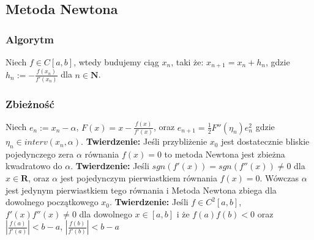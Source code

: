 \documentclass{article}
\begin{document}
\begin{minipage}[t]{.325\textwidth}
\subsection*{Metoda Newtona}
\subsubsection*{Algorytm}
Niech $f \in C[a,b]$, wtedy budujemy ciąg ${x_n}$, taki że: $x_{n+1} = x_{n} + h_n$, gdzie $h_n := -\frac{f(x_n)}{f'(x_n)}$ dla $n \in \mathbf{N}$.
\subsubsection*{Zbieżność}
Niech $e_n := x_n - \alpha$, $F(x) = x - \frac{f(x)}{f'(x)}$, oraz $e_{n+1} = \frac{1}{2}F''(\eta_n)e_n^2$ gdzie $\eta_n \in interv(x_n,\alpha)$.
\textbf{Twierdzenie:\;} Jeśli przybliżenie $x_0$ jest dostatecznie bliskie pojedynczego zera $\alpha$ równania $f(x) = 0$ to metoda Newtona jest zbieżna kwadratowo do $\alpha$.  \textbf{Twierdzenie:\;} Jeśli $sgn(f'(x)) = sgn(f''(x)) \neq 0$ dla $x \in \mathbf{R}$, oraz $\alpha$ jest pojedynczym pierwiastkiem równania $f(x) = 0$. 
Wówczas $\alpha$ jest jedynym pierwiastkiem tego równania i
Metoda Newtona zbiega dla dowolnego początkowego $x_{0}$.
\textbf{Twierdzenie:\;} Jeśli $f \in C^2[a,b]$, $f'(x)f''(x) \neq 0$ dla dowolnego $x \in [a,b]$ i że $f(a)f(b) < 0$ oraz  $\left|\frac{f(a)}{f'(a)}\right| < b-a$, $\left|\frac{f(b)}{f'(b)}\right| < b-a$
\end{minipage}
\end{document}
